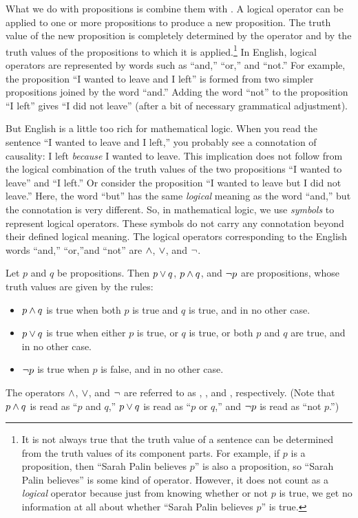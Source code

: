 What we do with propositions is combine them with
.  A logical operator can be
applied to one or more propositions to produce a new proposition.
The truth value of the new proposition is completely determined
by the operator and by the truth values of the propositions
to which it is applied.\footnote{It is not always true that the
truth value of a sentence can be determined from the truth values
of its component parts.  For example, if $p$ is a proposition,
then ``Sarah Palin believes $p$'' is also a proposition,
so ``Sarah Palin believes'' is some kind of operator.
However, it does not count as a \emph{logical} operator because
just from knowing whether or not $p$ is true, we get no information
at all about whether ``Sarah Palin believes $p$'' is true.}
In English, logical operators are represented by words such
as ``and,'' ``or,'' and ``not.''  For example, the
proposition ``I wanted to leave and I left'' is formed from
two simpler propositions joined by the word ``and.''  Adding
the word ``not'' to the proposition ``I left'' gives
``I did not leave'' (after a bit of necessary grammatical adjustment).

But English is a little too rich for mathematical logic.
When you read the sentence ``I wanted to leave and I left,''
you probably see a connotation of causality:  I left \emph{because}
I wanted to leave.  This implication does not follow from the
logical combination of the truth values of the two propositions
``I wanted to leave'' and ``I left.'' Or consider the
proposition ``I wanted to leave but I did not leave.''
Here, the word ``but'' has the same \emph{logical} meaning
as the word ``and,'' but the connotation is very different.
So, in mathematical logic, we use \emph{symbols} to represent
logical operators.  These symbols do not carry any connotation
beyond their defined logical meaning.  The logical operators
corresponding to the English words ``and,'' ``or,''and ``not'' 
are $\wedge$, $\vee$, and $\lnot$.

\begin{definition}
Let $p$ and $q$ be propositions.  Then $p\vee q$, $p \wedge q$, and
$\lnot p$ are propositions, whose truth values are given by the
rules:
\begin{itemize}
\item $p\wedge q$ is true when both $p$ is true and $q$ is true, and in 
no other case.
\item $p\vee q$ is true when either $p$ is true, or $q$ is true, or both
$p$ and $q$ are true, and in no other case.
\item$\lnot p$ is true when $p$ is false, and in no other case.
\end{itemize}
The operators $\wedge$, $\vee$, and $\lnot$ are referred to as ,
, and , respectively.
(Note that $p\wedge q$ is read as ``$p$ and $q$,'' $p\vee q$ is read
as ``$p$ or $q$,'' and $\lnot p$ is read as ``not $p$.'')
\end{definition}


